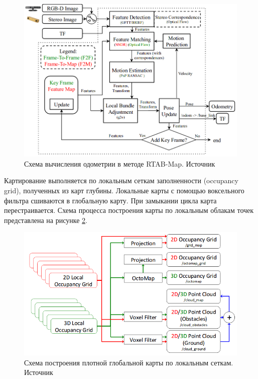 \documentclass{mipt-thesis-ms}
\begin{document}
	\begin{figure}
		\centering
		\includegraphics[scale=0.4]{img/rgbd_odometry.png}
		\caption{Схема вычисления одометрии в методе RTAB-Map. Источник \cite{labbe2019rtab}}
		\label{figurergbdodometry}
	\end{figure}
	
	Картирование выполняется по локальным сеткам заполненности (occupancy grid), полученных из карт глубины. Локальные карты с помощью воксельного фильтра сшиваются в глобальную карту. При замыкании цикла карта перестраивается. Схема процесса построения карты по локальным облакам точек представлена на рисунке \ref{figuremapping}.
	
	\begin{figure}
		\centering
		\includegraphics[scale=0.5]{img/rtabmap_mapping.png}
		\caption{Схема построения плотной глобальной карты по локальным сеткам. Источник \cite{labbe2019rtab}}
		\label{figuremapping}
	\end{figure}
	
\end{document}
